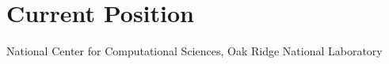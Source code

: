 \section{Current Position}
  \resumeSubHeadingListStart
     {National Center for Computational Sciences, Oak Ridge National Laboratory}
  \resumeSubHeadingListEnd
